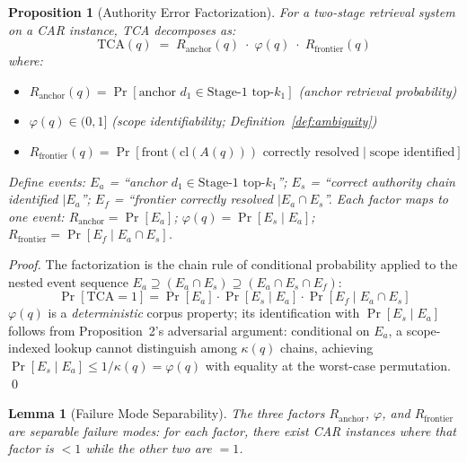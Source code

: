 \documentclass[11pt]{article}
\newtheorem{proposition}{Proposition}
\newtheorem{lemma}{Lemma}
\begin{document}
\setcounter{proposition}{0}
\begin{proposition}[Authority Error Factorization]
\label{prop:factorization}
For a two-stage retrieval system on a CAR instance, TCA decomposes as:
\[
  \mathrm{TCA}(q) \;=\; R_{\mathrm{anchor}}(q) \;\cdot\; \varphi(q) \;\cdot\; R_{\mathrm{frontier}}(q)
\]
where:
\begin{itemize}[noitemsep]
  \item $R_{\mathrm{anchor}}(q) = \Pr[\text{anchor } d_1 \in \text{Stage-1 top-}k_1]$ \hfill (anchor retrieval probability)
  \item $\varphi(q) \in (0,1]$ \hfill (scope identifiability; Definition~\ref{def:ambiguity})
  \item $R_{\mathrm{frontier}}(q) = \Pr[\mathrm{front}(\mathrm{cl}(A(q))) \text{ correctly resolved} \mid \text{scope identified}]$
\end{itemize}
Define events: $E_a$ = ``anchor $d_1 \in \text{Stage-1 top-}k_1$''; $E_s$ = ``correct authority chain identified $\mid E_a$''; $E_f$ = ``frontier correctly resolved $\mid E_a \cap E_s$''. Each factor maps to one event: $R_{\mathrm{anchor}} = \Pr[E_a]$; $\varphi(q) = \Pr[E_s \mid E_a]$; $R_{\mathrm{frontier}} = \Pr[E_f \mid E_a \cap E_s]$.
\end{proposition}

\begin{proof}
The factorization is the chain rule of conditional probability applied to the nested event sequence $E_a \supseteq (E_a \cap E_s) \supseteq (E_a \cap E_s \cap E_f)$:
\[
  \Pr[\mathrm{TCA}=1] = \Pr[E_a]\cdot\Pr[E_s\mid E_a]\cdot\Pr[E_f\mid E_a\cap E_s]
\]
$\varphi(q)$ is a \emph{deterministic} corpus property; its identification with $\Pr[E_s\mid E_a]$ follows from Proposition~2's adversarial argument: conditional on $E_a$, a scope-indexed lookup cannot distinguish among $\kappa(q)$ chains, achieving $\Pr[E_s\mid E_a] \leq 1/\kappa(q) = \varphi(q)$ with equality at the worst-case permutation. \qed
\end{proof}

\begin{lemma}[Failure Mode Separability]
\label{lem:separable}
The three factors $R_{\mathrm{anchor}}$, $\varphi$, and $R_{\mathrm{frontier}}$ are \emph{separable failure modes}: for each factor, there exist CAR instances where that factor is $< 1$ while the other two are $= 1$.
\end{lemma}
\end{document}
